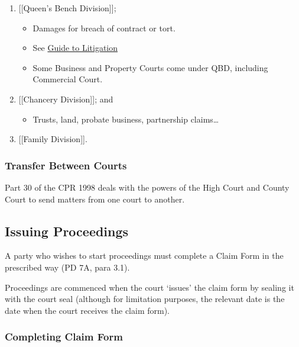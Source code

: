 \documentclass[
]{article}
\providecommand{\tightlist}{%
  \setlength{\itemsep}{0pt}\setlength{\parskip}{0pt}}
\begin{document}
\begin{enumerate}
\def\labelenumi{\arabic{enumi}.}
\tightlist
\item
  {[}{[}Queen's Bench Division{]}{]};

  \begin{itemize}
  \tightlist
  \item
    Damages for breach of contract or tort.
  \item
    See
    \href{https://www.judiciary.uk/wp-content/uploads/2022/02/QB-Guide-2022-Final-3-Feb-22-with-bookmarks.pdf}{Guide
    to Litigation}
  \item
    Some Business and Property Courts come under QBD, including
    Commercial Court.
  \end{itemize}
\item
  {[}{[}Chancery Division{]}{]}; and

  \begin{itemize}
  \tightlist
  \item
    Trusts, land, probate business, partnership claims\ldots{}
  \end{itemize}
\item
  {[}{[}Family Division{]}{]}.
\end{enumerate}

\hypertarget{transfer-between-courts}{%
\subsubsection{Transfer Between Courts}\label{transfer-between-courts}}

Part 30 of the CPR 1998 deals with the powers of the High Court and
County Court to send matters from one court to another.

\hypertarget{issuing-proceedings}{%
\subsection{Issuing Proceedings}\label{issuing-proceedings}}

A party who wishes to start proceedings must complete a Claim Form in
the prescribed way (PD 7A, para 3.1).

Proceedings are commenced when the court `issues' the claim form by
sealing it with the court seal (although for limitation purposes, the
relevant date is the date when the court receives the claim form).

\hypertarget{completing-claim-form}{%
\subsubsection{Completing Claim Form}\label{completing-claim-form}}
\end{document}
